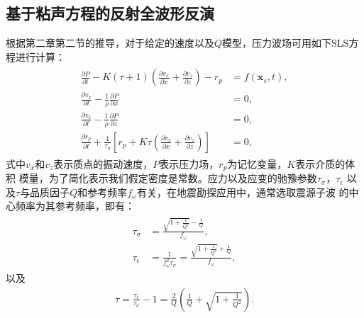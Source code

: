 \subsection{基于粘声方程的反射全波形反演}
\vspace{-1.0cm}
根据第二章第二节的推导，对于给定的速度以及$Q$模型，压力波场可用如下SLS方程进行计算：
     \begin{eqnarray}
        \begin{aligned}
        \frac{\partial P}{\partial t} -
        K(\tau+1)(\frac{\partial v_x}{\partial x}
        +\frac{\partial v_z}{\partial z})-r_p &=f(\mathbf{x}_s,t),
        \\
        \frac{\partial v_x}{\partial t} - \frac{1}{\rho}\frac{\partial P}{\partial x}
        &=0,\\
        \frac{\partial v_z}{\partial t} - \frac{1}{\rho}\frac{\partial P}{\partial z}&=0,\\
        \frac{\partial{r_p}}{\partial t} +
        \frac{1}{\tau_\sigma}\left[r_p+K\tau(\frac{\partial
        v_x}{\partial x}+\frac{\partial v_z}{\partial z})\right]&=0,
        \end{aligned}
        \label{eq:viscoacoustic}
    \end{eqnarray}
式中$v_x$和$v_z$表示质点的振动速度，$P$表示压力场，$r_p$为记忆变量，$K$表示介质的体积
模量，为了简化表示我们假定密度是常数。应力以及应变的驰豫参数$\tau_\sigma$，$\tau_\epsilon$
以及$\tau$与品质因子$Q$和参考频率$f_\omega$有关，在地震勘探应用中，通常选取震源子波
的中心频率为其参考频率，即有：
    \begin{eqnarray}
        \begin{aligned}
            \tau_\sigma &= \frac{\sqrt{1+\frac{1}{Q^2}}-\frac{1}{Q}}{f_\omega},\\
            \tau_\epsilon &= \frac{1}{f^2_\omega\tau_\sigma}=\frac{\sqrt{1+\frac{1}{Q^2}}+\frac{1}{Q}}{f_\omega},
        \end{aligned}
    \end{eqnarray}
以及
    \begin{eqnarray}
        \tau=\frac{\tau_\epsilon}{\tau_\sigma}-1=\frac{2}{Q}(\frac{1}{Q}+\sqrt{1+\frac{1}{Q^2}}).
        \label{eq:tq}
    \end{eqnarray}

